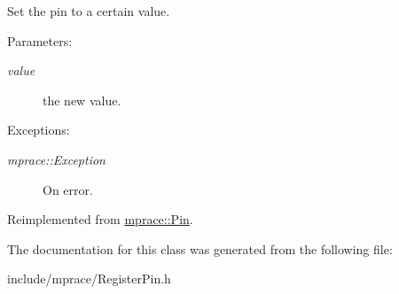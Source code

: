 Set the pin to a certain value. 

\begin{Desc}
\item[Parameters:]
\begin{description}
\item[{\em value}]the new value. \end{description}
\end{Desc}
\begin{Desc}
\item[Exceptions:]
\begin{description}
\item[{\em mprace::Exception}]On error.\end{description}
\end{Desc}


Reimplemented from \hyperlink{classmprace_1_1Pin_a1}{mprace::Pin}.

The documentation for this class was generated from the following file:\begin{CompactItemize}
\item 
include/mprace/Register\-Pin.h\end{CompactItemize}
